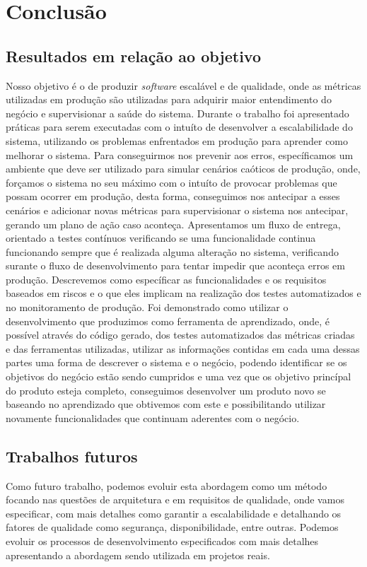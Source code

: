 \part{Conclusão}
  \chapter{Resultados em relação ao objetivo}
    Nosso objetivo é o de produzir \textit{software} escalável e de qualidade,
    onde as métricas utilizadas em produção são utilizadas para adquirir maior
    entendimento do negócio e supervisionar a saúde do sistema. \newline
    Durante o trabalho foi apresentado práticas para serem executadas com o
    intuíto de desenvolver a escalabilidade do sistema, utilizando os problemas
    enfrentados em produção para aprender como melhorar o sistema. Para conseguirmos
    nos prevenir aos erros, específicamos um ambiente que deve ser utilizado para
    simular cenários caóticos de produção, onde, forçamos o sistema no seu máximo
    com o intuíto de provocar problemas que possam ocorrer em produção, desta
    forma, conseguimos nos antecipar a esses cenários e adicionar novas métricas
    para supervisionar o sistema nos antecipar, gerando um plano de ação caso
    aconteça. \newline
    Apresentamos um fluxo de entrega, orientado a testes contínuos verificando
    se uma funcionalidade continua funcionando sempre que é realizada alguma
    alteração no sistema, verificando surante o fluxo de desenvolvimento para
    tentar impedir que aconteça erros em produção. Descrevemos como específicar
    as funcionalidades e os requisitos baseados em riscos e o que eles implicam
    na realização dos testes automatizados e no monitoramento de produção. \newline
    Foi demonstrado como utilizar o desenvolvimento que produzimos como ferramenta de
    aprendizado, onde, é possível através do código gerado, dos testes automatizados
    das métricas criadas e das ferramentas utilizadas, utilizar as informações
    contidas em cada uma dessas partes uma forma de descrever o sistema e o
    negócio, podendo identificar se os objetivos do negócio estão sendo cumpridos
    e uma vez que os objetivo princípal do produto esteja completo, conseguimos
    desenvolver um produto novo se baseando no aprendizado que obtivemos com este
    e possibilitando utilizar novamente funcionalidades que continuam aderentes
    com o negócio.

  \chapter{Trabalhos futuros}
    Como futuro trabalho, podemos evoluir esta abordagem como um método focando
    nas questões de arquitetura e em requisitos de qualidade, onde vamos especificar,
    com mais detalhes como garantir a escalabilidade e detalhando os fatores de
    qualidade como segurança, disponibilidade, entre outras. Podemos evoluir os
    processos de desenvolvimento especificados com mais detalhes apresentando a
    abordagem sendo utilizada em projetos reais.

